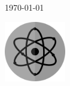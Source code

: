 \begin{titlepage}
	
	
	\vfill\vfill\vfill %
	
	{\large\today} %
	
	
	\vfill\vfill
	\includegraphics[width=0.2\textwidth]{LogoFysica}\\[1cm] %
	 
	
	\vfill %
\end{titlepage}
